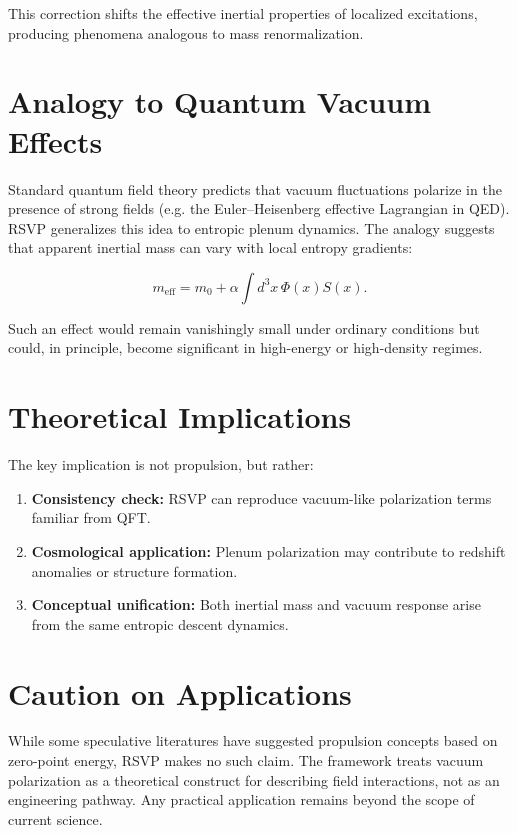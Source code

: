 \documentclass[12pt]{report}
\begin{document}
This correction shifts the effective inertial properties of localized excitations, producing phenomena analogous to mass renormalization.

\section{Analogy to Quantum Vacuum Effects}

Standard quantum field theory predicts that vacuum fluctuations polarize in the presence of strong fields (e.g. the Euler--Heisenberg effective Lagrangian in QED). RSVP generalizes this idea to entropic plenum dynamics. The analogy suggests that apparent inertial mass can vary with local entropy gradients:

\begin{equation}
m_{\text{eff}} = m_0 + \alpha \int d^3x \, \Phi(x) S(x).
\end{equation}

Such an effect would remain vanishingly small under ordinary conditions but could, in principle, become significant in high-energy or high-density regimes.

\section{Theoretical Implications}

The key implication is not propulsion, but rather:

\begin{enumerate}
    \item \textbf{Consistency check:} RSVP can reproduce vacuum-like polarization terms familiar from QFT.  
    \item \textbf{Cosmological application:} Plenum polarization may contribute to redshift anomalies or structure formation.  
    \item \textbf{Conceptual unification:} Both inertial mass and vacuum response arise from the same entropic descent dynamics.  
\end{enumerate}

\section{Caution on Applications}

While some speculative literatures have suggested propulsion concepts based on zero-point energy, RSVP makes no such claim. The framework treats vacuum polarization as a theoretical construct for describing field interactions, not as an engineering pathway. Any practical application remains beyond the scope of current science.
\end{document}
